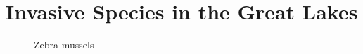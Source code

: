 \chapter{Invasive Species in the Great Lakes}
\label{cp:invasive-species}

\begin{figure}[htbp]
  \centering
  \begin{minipage}[b]{0.45\textwidth}
    \centering
    \caption{Zebra mussels}
    \label{fig:zebra}
  \end{minipage}
  \hfill
  \begin{minipage}[b]{0.45\textwidth}
    \centering

\end{minipage}
\end{figure}
